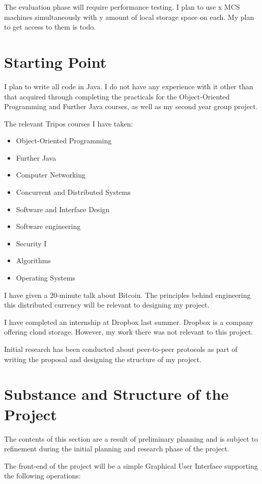\documentclass[12pt]{article}
\begin{document}
The evaluation phase will require performance testing. I plan to use x MCS machines simultaneously with y amount of local storage space on each. My plan to get access to them is todo. 

\section{Starting Point}

I plan to write all code in Java. I do not have any experience with it other than that acquired through completing the practicals for the Object-Oriented Programming and Further Java courses, as well as my second year group project.

The relevant Tripos courses I have taken:
\begin{itemize}
\item{Object-Oriented Programming}
\item{Further Java}
\item{Computer Networking}
\item{Concurrent and Distributed Systems}
\item{Software and Interface Design}
\item{Software engineering}
\item{Security I}
\item{Algorithms}
\item{Operating Systems}
\end{itemize}

I have given a 20-minute talk about Bitcoin. The principles behind engineering this distributed currency will be relevant to designing my project.

I have completed an internship at Dropbox last summer. Dropbox is a company offering cloud storage. However, my work there was not relevant to this project.

Initial research has been conducted about peer-to-peer protocols as part of writing the proposal and designing the structure of my project.

\section{Substance and Structure of the Project}

The contents of this section are a result of preliminary planning and is subject to refinement during the initial planning and research phase of the project.

The front-end of the project will be a simple Graphical User Interface supporting the following operations:
\end{document}
